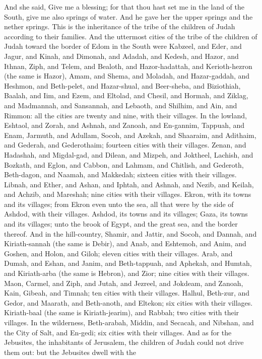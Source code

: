 And she said, Give me a blessing; for that thou hast set me in the land of the South, give me also springs of water. And he gave her the upper springs and the nether springs.  This is the inheritance of the tribe of the children of Judah according to their families.  And the uttermost cities of the tribe of the children of Judah toward the border of Edom in the South were Kabzeel, and Eder, and Jagur, and Kinah, and Dimonah, and Adadah, and Kedesh, and Hazor, and Ithnan, Ziph, and Telem, and Bealoth, and Hazor-hadattah, and Kerioth-hezron (the same is Hazor), Amam, and Shema, and Moladah, and Hazar-gaddah, and Heshmon, and Beth-pelet, and Hazar-shual, and Beer-sheba, and Biziothiah, Baalah, and Iim, and Ezem, and Eltolad, and Chesil, and Hormah, and Ziklag, and Madmannah, and Sansannah, and Lebaoth, and Shilhim, and Ain, and Rimmon: all the cities are twenty and nine, with their villages.  In the lowland, Eshtaol, and Zorah, and Ashnah, and Zanoah, and En-gannim, Tappuah, and Enam, Jarmuth, and Adullam, Socoh, and Azekah, and Shaaraim, and Adithaim, and Gederah, and Gederothaim; fourteen cities with their villages.  Zenan, and Hadashah, and Migdal-gad, and Dilean, and Mizpeh, and Joktheel, Lachish, and Bozkath, and Eglon, and Cabbon, and Lahmam, and Chitlish, and Gederoth, Beth-dagon, and Naamah, and Makkedah; sixteen cities with their villages.  Libnah, and Ether, and Ashan, and Iphtah, and Ashnah, and Nezib, and Keilah, and Achzib, and Mareshah; nine cities with their villages.  Ekron, with its towns and its villages; from Ekron even unto the sea, all that were by the side of Ashdod, with their villages.  Ashdod, its towns and its villages; Gaza, its towns and its villages; unto the brook of Egypt, and the great sea, and the border thereof.  And in the hill-country, Shamir, and Jattir, and Socoh, and Dannah, and Kiriath-sannah (the same is Debir), and Anab, and Eshtemoh, and Anim, and Goshen, and Holon, and Giloh; eleven cities with their villages.  Arab, and Dumah, and Eshan, and Janim, and Beth-tappuah, and Aphekah, and Humtah, and Kiriath-arba (the same is Hebron), and Zior; nine cities with their villages.  Maon, Carmel, and Ziph, and Jutah, and Jezreel, and Jokdeam, and Zanoah, Kain, Gibeah, and Timnah; ten cities with their villages.  Halhul, Beth-zur, and Gedor, and Maarath, and Beth-anoth, and Eltekon; six cities with their villages.  Kiriath-baal (the same is Kiriath-jearim), and Rabbah; two cities with their villages.  In the wilderness, Beth-arabah, Middin, and Secacah, and Nibshan, and the City of Salt, and En-gedi; six cities with their villages.  And as for the Jebusites, the inhabitants of Jerusalem, the children of Judah could not drive them out: but the Jebusites dwell with the 